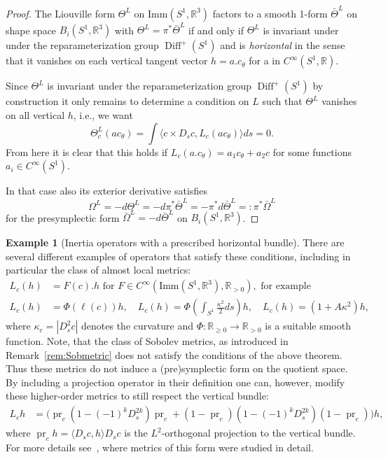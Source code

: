 \documentclass[12pt]{amsart}
\newcommand{\rev}[1]{#1}
\theoremstyle{definition}
\newtheorem{example}[theorem]{Example}
\newcommand{\R}{\mathbb R}
\newcommand{\Diffp}{\operatorname{Diff}^+(S^1)}
\newcommand{\Imm}{\mathrm{Imm}}
\def\ka{\kappa}
\def\Th{\Theta}
\def\Ph{\Phi}
\def\Om{\Omega}
\def\R{{\mathbb R}}
\let\on=\operatorname
\begin{document}
\begin{proof}
The Liouville form $\Th^L$ on $\Imm(S^1,\mathbb R^3)$ factors to a smooth 1-form $\bar\Th^L$ on shape space $B_i(S^1,\mathbb R^3)$ with $\Th^L = \pi^* \bar \Th^L$
if and only if $\Th^L$ is invariant under under the reparameterization group $\Diffp$ and is \emph{horizontal} in the sense that it vanishes on each vertical tangent vector $h=a.c_\theta$ for a in $C^\infty(S^1,\mathbb R)$. 

Since $\Th^L$ is invariant under the reparameterization group $\Diffp$ by construction it only  remains to determine a condition on $L$ such that $\Th^L$ vanishes on all vertical $h$, i.e., we want \begin{equation}
\Theta^L_c(ac_\theta)=\int \langle c\times D_sc, L_c(ac_\theta)\rangle ds=0.
\end{equation}
From here it is clear that this holds if $L_c(a.c_\theta)=a_1 c_\theta+a_2 c$ for some functions $a_i\in C^{\infty}(S^1)$.

In that case also its exterior derivative satisfies 
\begin{equation*}
 \Om^L=- d \Th^L = - d \pi^* \bar\Th^L = - \pi^* d \bar\Th^L =:  \pi^* \bar \Om^L   
\end{equation*}
for the presymplectic form $\bar\Om^L = - d\bar\Th^L$ on $B_i(S^1,\mathbb R^3)$.
\end{proof}
\begin{example}[Inertia operators with a prescribed horizontal bundle]
 There are several different examples of operators that satisfy these conditions, including in particular 
 the class of almost local metrics:
\begin{align*}
    L_c(h) &= F(c).h \text{ for }F\in C^\infty(\Imm(S^1,\mathbb R^3),\mathbb R_{>0}), \text{ for example}
\\
    L_c (h) &= \Ph(\rev{\ell(c)})h, \quad L_c (h) = \Ph(\int_{S^1} \frac{\ka^2}{2} ds)h, \quad L_c(h) = (1+ A\ka^2)h,
\end{align*}
\rev{where $\kappa_c=|D_s^2c|$ denotes the curvature and $\Phi\colon \R_{\geq 0}\to \R_{>0}$ is a suitable smooth function.}
Note, that the class of Sobolev metrics, as introduced in Remark~\ref{rem:Sobmetric} does not satisfy the conditions of the above theorem. Thus these metrics do not induce a (pre)symplectic form on the quotient space. 
By including a projection operator in their definition one can, however, modify these higher-order metrics to still respect the vertical bundle:
\begin{align*}
    L_c h &= \Big(\on{pr}_c(1- (-1)^k D_s^{2k})\on{pr}_c + (1-\on{pr}_c)(1- (-1)^k D_s^{2k})(1-\on{pr}_c)\Big ) h,
\end{align*}
where 
$\on{pr}_c h= \langle D_sc, h\rangle D_sc$  is the $L^2$-orthogonal projection to the vertical bundle. For more details see~\cite{bauer2015metrics}, where metrics of this form were studied in detail.
\end{example}
\end{document}
